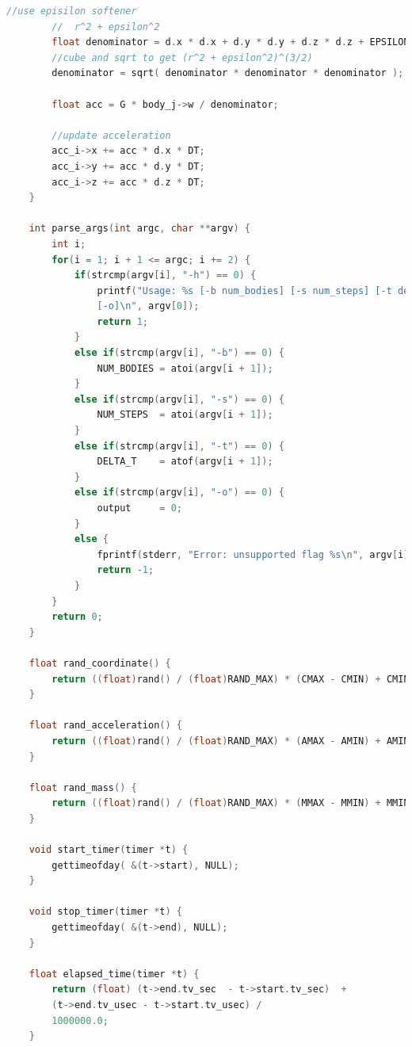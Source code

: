 \documentclass[11pt,a4paper]{article}
\begin{document}
\begin{lstlisting}[language=c]
		//use episilon softener
		//  r^2 + epsilon^2
		float denominator = d.x * d.x + d.y * d.y + d.z * d.z + EPSILON2;
		//cube and sqrt to get (r^2 + epsilon^2)^(3/2)
		denominator = sqrt( denominator * denominator * denominator );
		
		float acc = G * body_j->w / denominator;
		
		//update acceleration
		acc_i->x += acc * d.x * DT;
		acc_i->y += acc * d.y * DT;
		acc_i->z += acc * d.z * DT;
	}
	
	int parse_args(int argc, char **argv) {
		int i;
		for(i = 1; i + 1 <= argc; i += 2) {
			if(strcmp(argv[i], "-h") == 0) {
				printf("Usage: %s [-b num_bodies] [-s num_steps] [-t delta_t] \
				[-o]\n", argv[0]);
				return 1;
			}
			else if(strcmp(argv[i], "-b") == 0) {
				NUM_BODIES = atoi(argv[i + 1]);
			}
			else if(strcmp(argv[i], "-s") == 0) {
				NUM_STEPS  = atoi(argv[i + 1]);
			}
			else if(strcmp(argv[i], "-t") == 0) {
				DELTA_T    = atof(argv[i + 1]);
			}
			else if(strcmp(argv[i], "-o") == 0) {
				output     = 0;
			}
			else {
				fprintf(stderr, "Error: unsupported flag %s\n", argv[i]);
				return -1;
			}
		}
		return 0;
	}
	
	float rand_coordinate() {
		return ((float)rand() / (float)RAND_MAX) * (CMAX - CMIN) + CMIN;
	}
	
	float rand_acceleration() {
		return ((float)rand() / (float)RAND_MAX) * (AMAX - AMIN) + AMIN;
	}
	
	float rand_mass() { 
		return ((float)rand() / (float)RAND_MAX) * (MMAX - MMIN) + MMIN;
	}
	
	void start_timer(timer *t) {
		gettimeofday( &(t->start), NULL);
	}
	
	void stop_timer(timer *t) {
		gettimeofday( &(t->end), NULL);
	}
	
	float elapsed_time(timer *t) {
		return (float) (t->end.tv_sec  - t->start.tv_sec)  + 
		(t->end.tv_usec - t->start.tv_usec) /
		1000000.0;
	}
	\end{lstlisting}
	
\end{document}
